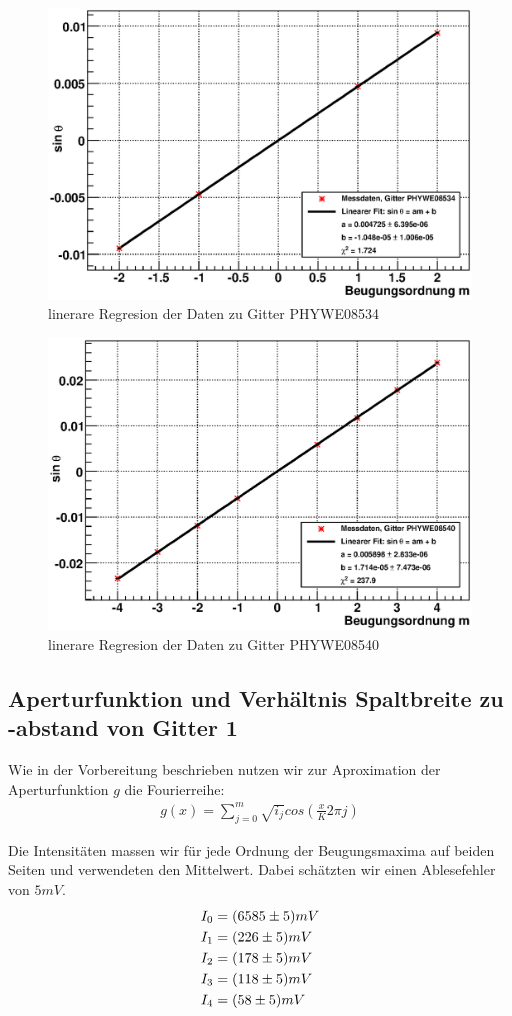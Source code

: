 \documentclass[12pt]{article}
\begin{document}
\begin{figure}[H]  
\centering
\includegraphics[width=0.7\linewidth]{pictures/phywe08534.eps}
\caption{linerare Regresion der Daten zu Gitter PHYWE08534}
\end{figure}

\begin{figure}[H]  
\centering
\includegraphics[width=0.7\linewidth]{pictures/phywe08540.eps}
\caption{linerare Regresion der Daten zu Gitter PHYWE08540}
\end{figure}

\subsection{Aperturfunktion und Verhältnis Spaltbreite zu -abstand von Gitter 1}

Wie in der Vorbereitung beschrieben nutzen wir zur Aproximation der Aperturfunktion $g$ die Fourierreihe:
\begin{align}
 g(x) = \sum_{j=0}^{m}{\sqrt{i_j}cos \left( \frac{x}{K} 2 \pi j \right)}
\end{align}

Die Intensitäten massen wir für jede Ordnung der Beugungsmaxima auf beiden Seiten und verwendeten den Mittelwert. Dabei schätzten wir einen Ablesefehler von $5mV$. 
\begin{align}
 \notag
I_0 &= (6585 \pm 5) mV \\
 \notag
I_1 &= (226 \pm 5) mV \\
 \notag
I_2 &= (178 \pm 5) mV \\
 \notag
I_3 &= (118 \pm 5) mV \\
 \notag
I_4 &= (58 \pm 5) mV
\end{align}
\end{document}
